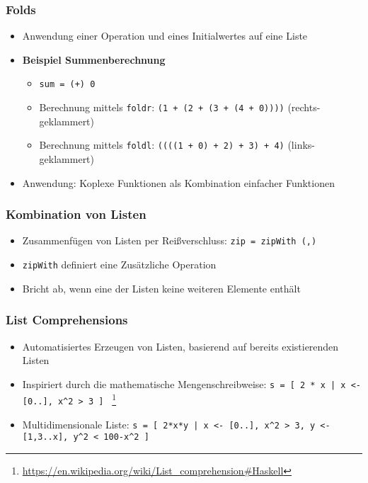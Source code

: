 \subsubsection{Folds}
\begin{itemize}
	\item Anwendung einer Operation und eines Initialwertes auf eine Liste
	\item \textbf{Beispiel Summenberechnung}
	\begin{itemize}
		\item \texttt{sum = (+) 0}
		\item Berechnung mittels \texttt{foldr}: \texttt{(1 + (2 + (3 + (4 + 0))))} (rechts-geklammert)
		\item Berechnung mittels \texttt{foldl}: \texttt{((((1 + 0) + 2) + 3) + 4)} (links-geklammert)
	\end{itemize}
	\item Anwendung: Koplexe Funktionen als Kombination einfacher Funktionen
\end{itemize}

\subsubsection{Kombination von Listen}
\begin{itemize}
	\item Zusammenfügen von Listen per Reißverschluss: \texttt{zip = zipWith (,)}
	\item \texttt{zipWith} definiert eine Zusätzliche Operation
	\item Bricht ab, wenn eine der Listen keine weiteren Elemente enthält
\end{itemize}

\subsubsection{List Comprehensions}
\begin{itemize}
	\item Automatisiertes Erzeugen von Listen, basierend auf bereits existierenden Listen
	\item Inspiriert durch die mathematische Mengenschreibweise: \texttt{s = {[} 2 * x {|} x <- {[}0..{]}, x\textasciicircum 2 > 3 {]} } \footnote{\url{https://en.wikipedia.org/wiki/List_comprehension\#Haskell}}
	\item Multidimensionale Liste: \texttt{s = {[} 2*x*y {|} x <- {[}0..{]}, x\textasciicircum2 > 3, y <- {[}1,3..x{]}, y\textasciicircum2 < 100-x\textasciicircum2 {]}}
\end{itemize}


